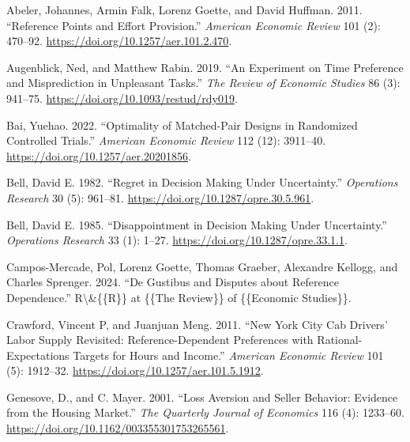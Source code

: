 \documentclass[
  12,
  letterpaper,
  DIV=11,
  numbers=noendperiod]{scrartcl}
\newlength{\cslhangindent}
\newenvironment{CSLReferences}[2] %
 {\begin{list}{}{%
  \setlength{\itemindent}{0pt}
  \setlength{\leftmargin}{0pt}
  \setlength{\parsep}{0pt}
  \ifodd #1
   \setlength{\leftmargin}{\cslhangindent}
   \setlength{\itemindent}{-1\cslhangindent}
  \fi
  \setlength{\itemsep}{#2\baselineskip}}}
 {\end{list}}
\begin{document}
\protect{}\label{refs}
\begin{CSLReferences}{1}{1}
Abeler, Johannes, Armin Falk, Lorenz Goette, and David Huffman. 2011.
{``Reference {Points} and {Effort Provision}.''} \emph{American Economic
Review} 101 (2): 470--92. \url{https://doi.org/10.1257/aer.101.2.470}.

Augenblick, Ned, and Matthew Rabin. 2019. {``An {Experiment} on {Time
Preference} and {Misprediction} in {Unpleasant Tasks}.''} \emph{The
Review of Economic Studies} 86 (3): 941--75.
\url{https://doi.org/10.1093/restud/rdy019}.

Bai, Yuehao. 2022. {``Optimality of {Matched-Pair Designs} in
{Randomized Controlled Trials}.''} \emph{American Economic Review} 112
(12): 3911--40. \url{https://doi.org/10.1257/aer.20201856}.

Bell, David E. 1982. {``Regret in {Decision Making} Under
{Uncertainty}.''} \emph{Operations Research} 30 (5): 961--81.
\url{https://doi.org/10.1287/opre.30.5.961}.

Bell, David E. 1985. {``Disappointment in {Decision Making Under
Uncertainty}.''} \emph{Operations Research} 33 (1): 1--27.
\url{https://doi.org/10.1287/opre.33.1.1}.

Campos-Mercade, Pol, Lorenz Goette, Thomas Graeber, Alexandre Kellogg,
and Charles Sprenger. 2024. {``De {Gustibus} and {Disputes} about
{Reference Dependence}.''} R\textbackslash\&\{\{R\}\} at \{\{The
Review\}\} of \{\{Economic Studies\}\}.

Crawford, Vincent P, and Juanjuan Meng. 2011. {``New {York City Cab
Drivers}' {Labor Supply Revisited}: {Reference-Dependent Preferences}
with {Rational-Expectations Targets} for {Hours} and {Income}.''}
\emph{American Economic Review} 101 (5): 1912--32.
\url{https://doi.org/10.1257/aer.101.5.1912}.

Genesove, D., and C. Mayer. 2001. {``Loss {Aversion} and {Seller
Behavior}: {Evidence} from the {Housing Market}.''} \emph{The Quarterly
Journal of Economics} 116 (4): 1233--60.
\url{https://doi.org/10.1162/003355301753265561}.


\end{CSLReferences}
\end{document}
